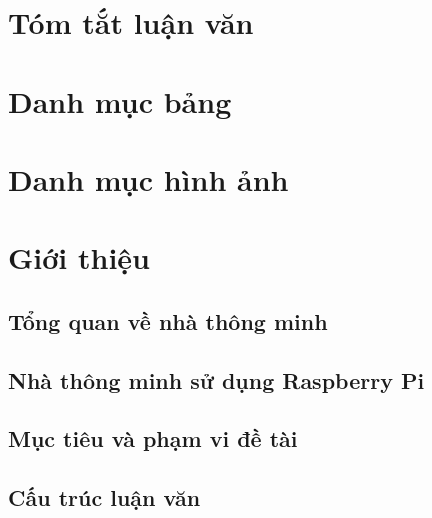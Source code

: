 \documentclass[11pt,a4paper,oneside]{book}
\begin{document}
\chapter*{Tóm tắt luận văn}

\begingroup
\let\cleardoublepage\clearpage
\tableofcontents 
 
\endgroup

\chapter*{Danh mục bảng}

\chapter*{Danh mục hình ảnh}

\mainmatter

\chapter{Giới thiệu}
\newpage
\section{Tổng quan về nhà thông minh}
\newpage
\section{Nhà thông minh sử dụng Raspberry Pi}
\newpage
\section{Mục tiêu và phạm vi đề tài}
\newpage
\section{Cấu trúc luận văn}

\end{document}
